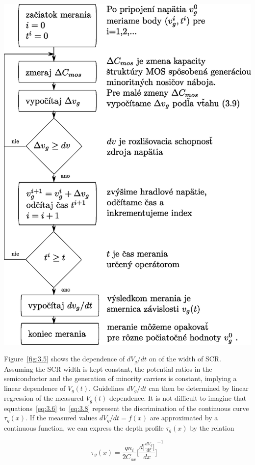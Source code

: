 \begin{diagram}
  \includegraphics[scale=0.55,keepaspectratio]{Figures/diagram-2.EPS}\label{diagram:2}
\end{diagram}

Figure~\ref{fig:3.5} shows the dependence of ${dV_g}/{dt}$ on of the
width of SCR\@. Assuming the SCR width is kept constant, the potential
ratios in the semiconductor and the generation of minority carriers is
constant, implying a linear dependence of $V_g(t)$.  Guidelines
${dV_g}/{dt}$ can then be determined by linear regression of the
measured $V_g(t)$ dependence. It is not difficult to imagine that
equations~\ref{eq:3.6} to~\ref{eq:3.8} represent the discrimination of
the continuous curve $\tau_g(x)$. If the measured values
${dV_g}/{dt}=f(x)$ are approximated by a continuous function, we can
express the depth profile $\tau_g(x)$ by the relation

\begin{equation}\label{eq:3.10}
  \tau_g(x) = \frac{qn_i}{2C_{ox}} {\Bigg[\frac{d\big[\frac{dV_g}{dt}\big]}{dx}\Bigg]}^{-1}
\end{equation}

